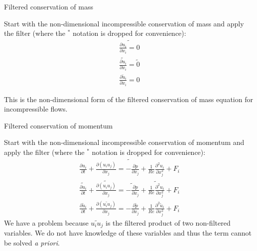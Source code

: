 \begin{frame}{Filtered conservation of mass}

Start with the non-dimensional incompressible conservation of mass and apply the filter (where the $^*$ notation is dropped for convenience):
\begin{gather*}
\widetilde{\frac{\partial u_i}{\partial x_i} = 0}\\
\widetilde{\frac{\partial u_i}{\partial x_i}} = \tilde 0 \\
\boxed{\frac{\partial \tilde u_i}{\partial x_i} = 0}
\end{gather*}

This is the non-dimensional form of the filtered conservation of mass equation for incompressible flows.
\end{frame}


\begin{frame}{Filtered conservation of momentum}

Start with the non-dimensional incompressible conservation of momentum and apply the filter (where the $^*$ notation is dropped for convenience):
\begin{gather*}
\widetilde{\frac{\partial u_i}{\partial t} + \frac{\partial (u_i u_j)}{\partial x_j} = - \frac{\partial p}{\partial x_j} + \frac{1}{Re} \frac{\partial^2 u_i}{\partial x_j^{2}} + F_i}\\
\widetilde{\frac{\partial u_i}{\partial t}} + \widetilde{\frac{\partial (u_i u_j)}{\partial x_j}} = \widetilde{- \frac{\partial p}{\partial x_j}} + \widetilde{\frac{1}{Re} \frac{\partial^2 u_i}{\partial x_j^{2}}} + F_i \\
\frac{\partial \tilde u_i}{\partial t} + \frac{\partial (\widetilde{u_i u_j})}{\partial x_j} = - \frac{\partial \tilde p}{\partial x_j} + \frac{1}{Re} \frac{\partial^2 \tilde u_i}{\partial x_j^{2}} + F_i
\end{gather*}
We have a problem because $\widetilde{u_i u_j}$ is the filtered product of two non-filtered variables. We do not have knowledge of these variables and thus the term cannot be solved \textit{a priori}.
\end{frame}


